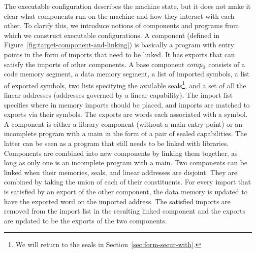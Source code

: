 \documentclass[acmsmall,screen]{acmart}\settopmatter{}
\renewcommand{\comp}{\var{comp}}
\begin{document}
The executable configuration describes the machine state, but it does not make it clear what components run on the machine and how they interact with each other.
To clarify this, we introduce notions of components and programs from which we construct executable configurations.
A component (defined in Figure~\ref{fig:target-component-and-linking}) is basically a program with entry points in the form of imports that need to be linked.
It has exports that can satisfy the imports of other components.
A base component $\comp_0$ consists of a code memory segment, a data memory segment, a list of imported symbols, a list of exported symbols, two lists specifying the available seals\footnote{We will return to the seals in Section~\ref{sec:form-secur-with}.}, and a set of all the linear addresses (addresses governed by a linear capability).
The import list specifies where in memory imports should be placed, and imports are matched to exports via their symbols.
The exports are words each associated with a symbol.
A component is either a library component (without a main entry point) or an incomplete program with a main in the form of a pair of sealed capabilities.
The latter can be seen as a program that still needs to be linked with libraries.
Components are combined into new components by linking them together, as long as only one is an incomplete program with a main.
Two components can be linked when their memories, seals, and linear addresses are disjoint.
They are combined by taking the union of each of their constituents.
For every import that is satisfied by an export of the other component, the data memory is updated to have the exported word on the imported address.
The satisfied imports are removed from the import list in the resulting linked component and the exports are updated to be the exports of the two components.
\end{document}
